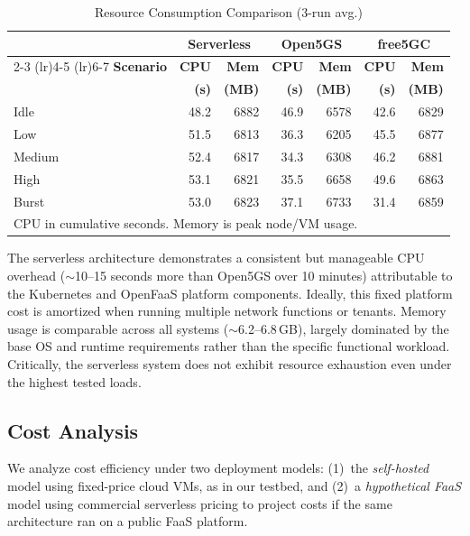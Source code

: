 \begin{table}[t]
\centering
\caption{Resource Consumption Comparison (3-run avg.)}
\label{tab:resource-comparison}
\footnotesize
\begin{tabular}{@{}l rr rr rr@{}}
\toprule
 & \multicolumn{2}{c}{\textbf{Serverless}} & \multicolumn{2}{c}{\textbf{Open5GS}} & \multicolumn{2}{c}{\textbf{free5GC}} \\
\cmidrule(lr){2-3} \cmidrule(lr){4-5} \cmidrule(lr){6-7}
\textbf{Scenario} & \textbf{CPU} & \textbf{Mem} & \textbf{CPU} & \textbf{Mem} & \textbf{CPU} & \textbf{Mem} \\
 & \textbf{(s)} & \textbf{(MB)} & \textbf{(s)} & \textbf{(MB)} & \textbf{(s)} & \textbf{(MB)} \\
\midrule
Idle   & 48.2 & 6882 & 46.9 & 6578 & 42.6 & 6829 \\
Low    & 51.5 & 6813 & 36.3 & 6205 & 45.5 & 6877 \\
Medium & 52.4 & 6817 & 34.3 & 6308 & 46.2 & 6881 \\
High   & 53.1 & 6821 & 35.5 & 6658 & 49.6 & 6863 \\
Burst  & 53.0 & 6823 & 37.1 & 6733 & 31.4 & 6859 \\
\bottomrule
\multicolumn{7}{l}{\scriptsize CPU in cumulative seconds. Memory is peak node/VM usage.}
\end{tabular}
\end{table}

The serverless architecture demonstrates a consistent but manageable CPU overhead ($\sim$10--15 seconds more than Open5GS over 10 minutes) attributable to the Kubernetes and OpenFaaS platform components. Ideally, this fixed platform cost is amortized when running multiple network functions or tenants. Memory usage is comparable across all systems ($\sim$6.2--6.8\,GB), largely dominated by the base OS and runtime requirements rather than the specific functional workload. Critically, the serverless system does not exhibit resource exhaustion even under the highest tested loads.

\subsection{Cost Analysis}

We analyze cost efficiency under two deployment models: (1)~the \textit{self-hosted} model using fixed-price cloud VMs, as in our testbed, and (2)~a \textit{hypothetical FaaS} model using commercial serverless pricing to project costs if the same architecture ran on a public FaaS platform.

